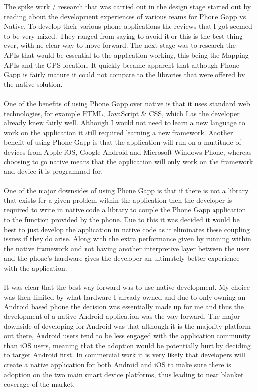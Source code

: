 The spike work / research that was carried out in the design stage started out by reading about the development experiences of various teams for Phone Gapp vs Native. To develop their various phone applications the reviews that I got seemed to be very mixed. They ranged from saying to avoid it or this is the best thing ever, with no clear way to move forward. The next stage was to research the APIs that would be essential to the application working, this being the Mapping APIs and the GPS location. It quickly became apparent that although Phone Gapp is fairly mature it could not compare to the libraries that were offered by the native solution.\\
\\
One of the benefits of using Phone Gapp over native is that it uses standard web technologies, for example HTML, JavaScript \& CSS, which I as the developer already knew fairly well. Although I would not need to learn a new language to work on the application it still required learning a new framework. Another benefit of using Phone Gapp is that the application will run on a multitude of devices from Apple iOS, Google Android and Microsoft Windows Phone, whereas choosing to go native means that the application will only work on the framework and device it is programmed for.\\
\\
One of the major downsides of using Phone Gapp is that if there is not a library that exists for a given problem within the application then the developer is required to write in native code a library to couple the Phone Gapp application to the function provided by the phone. Due to this it was decided it would be best to just develop the application in native code as it eliminates these coupling issues if they do arise. Along with the extra performance given by running within the native framework and not having another interpretive layer between the user and the phone's hardware gives the developer an ultimately better experience with the application.\\
\\
It was clear that the best way forward was to use native development. My choice was then limited by what hardware I already owned and due to only owning an Android based phone the decision was essentially made up for me and thus the development of a native Android application was the way forward. The major downside of developing for Android was that although it is the majority platform out there, Android users tend to be less engaged with the application community than iOS users, meaning that the adoption would be potentially hurt by deciding to target Android first. In commercial work it is very likely that developers will create a native application for both Android and iOS to make sure there is adoption on the two main smart device platforms, thus leading to near blanket coverage of the market.\\
